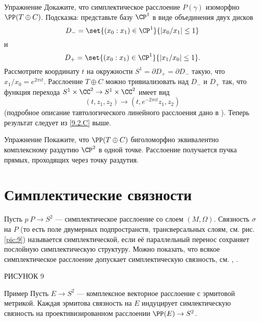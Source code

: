 \begin{thm}{Упражнение}\label{9.2.D}
Докажите, что симплектическое расслоение $P(\gamma)$ изоморфно $\PP(T
\oplus C)$. 
Подсказка: представьте базу $\CP^1$ в виде объединения двух дисков
\[D_- = \set{(x_0 : x_1 ) \in \CP^1}{ |x_0 /x_1 | \le 1}\]
и
\[D_+ = \set{(x_0 : x_1 ) \in \CP^1}{|x_1 /x_0 | \le 1}.\]
Рассмотрите координату $t$ на окружности $S^1 = \partial D_+ =
\partial D_-$ такую, что $x_1 /x_0 = e^{2\pi it}$. 
Расслоение $T \oplus C$ можно тривиализовать над $D_-$ и $D_+$ так,
что функция перехода $S^1 \times \CC^2 \to S^1 \times \CC^2$ имеет вид  
\[(t, z_1, z_2 ) \to (t, e^{-2\pi it} z_1, z_2 )\]
(подробное описание тавтологического линейного расслоения дано в
\cite{GH}). 
Теперь результат следует из \ref{9.2.C} выше.
\end{thm}

\begin{thm}{Упражнение}\label{9.2.E}
Покажите, что $\PP(T \oplus C)$ биголоморфно эквивалентно комплексному
раздутию $\CP^2$ в одной точке. 
Расслоение получается   пучка прямых, проходящих
через точку раздутия. 
\end{thm}


\section{Симплектические связности}

Пусть $p\: P\to S^2$ --- симплектическое расслоение со слоем $(M,\Omega)$.
Связность $\sigma$ на $P$ (то есть поле двумерных подпространств, трансверсальных слоям, см. рис. \ref{pic:9}) называется симплектической, если её параллельный перенос сохраняет послойную симплектическую структуру.
Можно показать, что всякое симплектическое расслоение допускает симплектическую связность, см. \cite{GLS}, \cite{MS}.

РИСУНОК 9 

\begin{thm*}{Пример}
Пусть $E \to S^2$ --- комплексное векторное расслоение с эрмитовой метрикой.
Каждая эрмитова связность на $E$ индуцирует симлектическую связность на проективизированном расслоении $\PP(E) \to S^2$.
\end{thm*}

